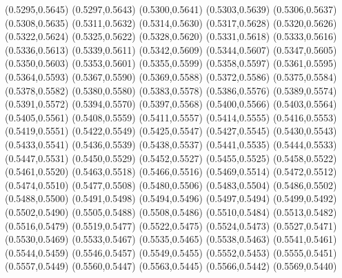 \PST@Cross(0.5295,0.5645)
\PST@Cross(0.5297,0.5643)
\PST@Cross(0.5300,0.5641)
\PST@Cross(0.5303,0.5639)
\PST@Cross(0.5306,0.5637)
\PST@Cross(0.5308,0.5635)
\PST@Cross(0.5311,0.5632)
\PST@Cross(0.5314,0.5630)
\PST@Cross(0.5317,0.5628)
\PST@Cross(0.5320,0.5626)
\PST@Cross(0.5322,0.5624)
\PST@Cross(0.5325,0.5622)
\PST@Cross(0.5328,0.5620)
\PST@Cross(0.5331,0.5618)
\PST@Cross(0.5333,0.5616)
\PST@Cross(0.5336,0.5613)
\PST@Cross(0.5339,0.5611)
\PST@Cross(0.5342,0.5609)
\PST@Cross(0.5344,0.5607)
\PST@Cross(0.5347,0.5605)
\PST@Cross(0.5350,0.5603)
\PST@Cross(0.5353,0.5601)
\PST@Cross(0.5355,0.5599)
\PST@Cross(0.5358,0.5597)
\PST@Cross(0.5361,0.5595)
\PST@Cross(0.5364,0.5593)
\PST@Cross(0.5367,0.5590)
\PST@Cross(0.5369,0.5588)
\PST@Cross(0.5372,0.5586)
\PST@Cross(0.5375,0.5584)
\PST@Cross(0.5378,0.5582)
\PST@Cross(0.5380,0.5580)
\PST@Cross(0.5383,0.5578)
\PST@Cross(0.5386,0.5576)
\PST@Cross(0.5389,0.5574)
\PST@Cross(0.5391,0.5572)
\PST@Cross(0.5394,0.5570)
\PST@Cross(0.5397,0.5568)
\PST@Cross(0.5400,0.5566)
\PST@Cross(0.5403,0.5564)
\PST@Cross(0.5405,0.5561)
\PST@Cross(0.5408,0.5559)
\PST@Cross(0.5411,0.5557)
\PST@Cross(0.5414,0.5555)
\PST@Cross(0.5416,0.5553)
\PST@Cross(0.5419,0.5551)
\PST@Cross(0.5422,0.5549)
\PST@Cross(0.5425,0.5547)
\PST@Cross(0.5427,0.5545)
\PST@Cross(0.5430,0.5543)
\PST@Cross(0.5433,0.5541)
\PST@Cross(0.5436,0.5539)
\PST@Cross(0.5438,0.5537)
\PST@Cross(0.5441,0.5535)
\PST@Cross(0.5444,0.5533)
\PST@Cross(0.5447,0.5531)
\PST@Cross(0.5450,0.5529)
\PST@Cross(0.5452,0.5527)
\PST@Cross(0.5455,0.5525)
\PST@Cross(0.5458,0.5522)
\PST@Cross(0.5461,0.5520)
\PST@Cross(0.5463,0.5518)
\PST@Cross(0.5466,0.5516)
\PST@Cross(0.5469,0.5514)
\PST@Cross(0.5472,0.5512)
\PST@Cross(0.5474,0.5510)
\PST@Cross(0.5477,0.5508)
\PST@Cross(0.5480,0.5506)
\PST@Cross(0.5483,0.5504)
\PST@Cross(0.5486,0.5502)
\PST@Cross(0.5488,0.5500)
\PST@Cross(0.5491,0.5498)
\PST@Cross(0.5494,0.5496)
\PST@Cross(0.5497,0.5494)
\PST@Cross(0.5499,0.5492)
\PST@Cross(0.5502,0.5490)
\PST@Cross(0.5505,0.5488)
\PST@Cross(0.5508,0.5486)
\PST@Cross(0.5510,0.5484)
\PST@Cross(0.5513,0.5482)
\PST@Cross(0.5516,0.5479)
\PST@Cross(0.5519,0.5477)
\PST@Cross(0.5522,0.5475)
\PST@Cross(0.5524,0.5473)
\PST@Cross(0.5527,0.5471)
\PST@Cross(0.5530,0.5469)
\PST@Cross(0.5533,0.5467)
\PST@Cross(0.5535,0.5465)
\PST@Cross(0.5538,0.5463)
\PST@Cross(0.5541,0.5461)
\PST@Cross(0.5544,0.5459)
\PST@Cross(0.5546,0.5457)
\PST@Cross(0.5549,0.5455)
\PST@Cross(0.5552,0.5453)
\PST@Cross(0.5555,0.5451)
\PST@Cross(0.5557,0.5449)
\PST@Cross(0.5560,0.5447)
\PST@Cross(0.5563,0.5445)
\PST@Cross(0.5566,0.5442)
\PST@Cross(0.5569,0.5440)
